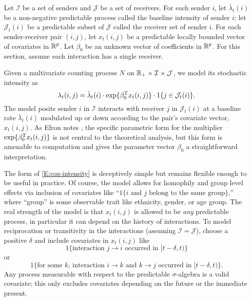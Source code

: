 \documentclass[aoas,preprint]{imsart}
\begin{document}
Let $\mathcal{I}$ be a set of senders and $\mathcal{J}$ be a set of receivers.
For each sender $i$, let $\bar \lambda_t(i)$ be a non-negative predictable
process called the baseline intensity of sender $i$; let $\mathcal{J}_t(i)$ be 
a predictable subset of $\mathcal{J}$ called the receiver set of sender $i$.
For each sender-receiver pair $(i,j)$, let $x_t(i,j)$ be a predictable
locally bounded vector of covariates in $\mathbb{R}^p$.  Let $\beta_0$
be an unknown vector of coefficients in  $\mathbb{R}^p$.  For this section, 
assume each interaction has a single receiver.

Given a multivariate counting process $N$ on 
$\mathbb{R}_+ \times \mathcal{I} \times \mathcal{J}$,
we model its stochastic intensity as
\begin{equation}\label{E:cox-intensity}
    \lambda_t(i,j)
        =
        \bar \lambda_t(i)
        \cdot
        \exp\{ \beta_0^\trans x_t(i, j) \}
        \cdot
        1{\{j \in \mathcal{J}_t(i)\}}.
\end{equation}
The model posits sender $i$ in $\mathcal{I}$ interacts  with receiver $j$ 
in $\mathcal{J}_t(i)$ at a baseline rate $\bar \lambda_t(i)$ modulated up or 
down according to the pair's covariate vector, $x_t(i,j)$.  As Efron notes
\cite{efron1977efficiency}, the specific parametric form for the multiplier
$\exp\{ \beta_0^{\mathrm{T}} x_t(i,j) \}$ is not central to the theoretical 
analysis, but this form is amenable to computation and gives
the parameter vector $\beta_0$ a straightforward interpretation.

The form of \eqref{E:cox-intensity} is deceptively simple but remains 
flexible enough to be useful in practice.  Of course, the model allows for
homophily and group level effects via inclusion of covariates like
``$1\{\text{$i$ and $j$ belong to the same group}\}$,'' where ``group'' is 
some observable trait like ethnicity, gender, or age group.  The real strength
of the model is that $x_t(i,j)$ is allowed to be \emph{any} predictable
process, in particular it can depend on the history of interactions.  To
model reciprocation or transitivity in the interactions  (assuming 
$\mathcal{I} = \mathcal{J}$), choose a positive $\delta$ and include 
covariates in $x_t(i,j)$ like
\[
    1\{\text{interaction $j \to i$ occurred in $[t - \delta,t)$}\}
\]
or
\[
    1\{\text{for some $k$, interaction $i\to k$ and $k \to j$ occurred in
             $[t - \delta, t)$}\}.
\]
Any process measurable with respect to the predictable $\sigma$-algebra is
a valid covariate; this only excludes covariates depending on the future
or the immediate present.
\end{document}
